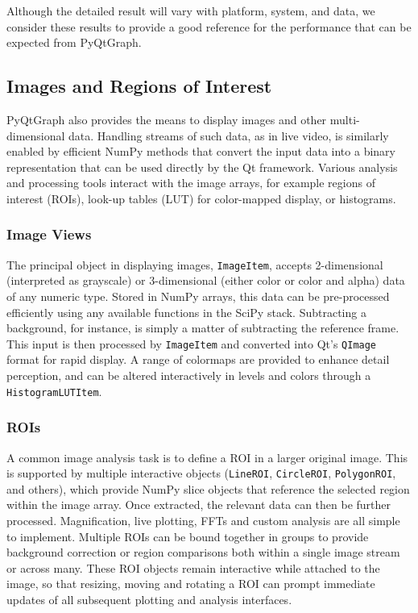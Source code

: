 Although the detailed result will vary with platform, system, and data, we consider these results to provide a good reference for the performance that can be expected from PyQtGraph.

\makeLineBenchmarkFig

\subsection{Images and Regions of Interest}

PyQtGraph also provides the means to display images and other multi-dimensional data. Handling streams of such data, as in live video, is similarly enabled by efficient NumPy methods that convert the input data into a binary representation that can be used directly by the Qt framework. Various analysis and processing tools interact with the image arrays, for example regions of interest (ROIs), look-up tables (LUT) for color-mapped display, or histograms.

\subsubsection{Image Views}

\makeARBBenchmarkFig

\makeMatplotlibComparison

The principal object in displaying images, \texttt{ImageItem}, accepts 2-dimensional (interpreted as grayscale) or 3-dimensional (either color or color and alpha) data of any numeric type. Stored in NumPy arrays, this data can be pre-processed efficiently using any available functions in the SciPy stack. Subtracting a background, for instance, is simply a matter of subtracting the reference frame. This input is then processed by \texttt{ImageItem} and converted into Qt's \texttt{QImage} format for rapid display. A range of colormaps are provided to enhance detail perception, and can be altered interactively in levels and colors through a \texttt{HistogramLUTItem}.

\subsubsection{ROIs}

A common image analysis task is to define a ROI in a larger original image. This is supported by multiple interactive objects (\texttt{LineROI}, \texttt{CircleROI}, \texttt{PolygonROI}, and others), which provide NumPy slice objects that reference the selected region within the image array. Once extracted, the relevant data can then be further processed. Magnification, live plotting, FFTs and custom analysis are all simple to implement. Multiple ROIs can be bound together in groups to provide background correction or region comparisons both within a single image stream or across many. These ROI objects remain interactive while attached to the image, so that resizing, moving and rotating a ROI can prompt immediate updates of all subsequent plotting and analysis interfaces.


